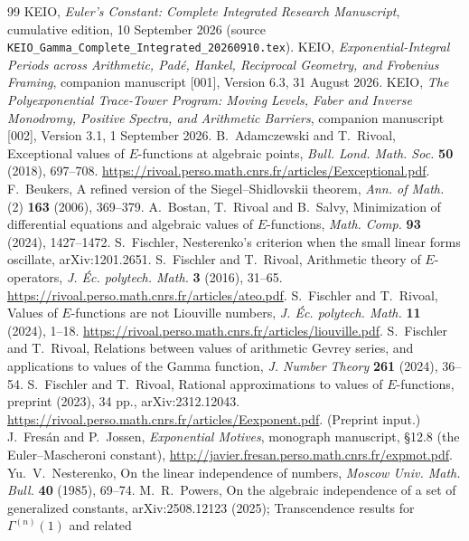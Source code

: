 \documentclass[11pt,a4paper]{article}
\theoremstyle{definition}
\theoremstyle{remark}
\numberwithin{equation}{section}
\begin{document}
\begin{thebibliography}{99}\small
{} KEIO, \emph{Euler's Constant: Complete Integrated Research Manuscript},
cumulative edition, 10 September 2026 (source
\texttt{KEIO\_Gamma\_Complete\_Integrated\_20260910.tex}).
 KEIO, \emph{Exponential-Integral Periods across Arithmetic, Pad\'e, Hankel,
Reciprocal Geometry, and Frobenius Framing}, companion manuscript [001], Version 6.3,
31 August 2026.
 KEIO, \emph{The Polyexponential Trace-Tower Program: Moving Levels, Faber
and Inverse Monodromy, Positive Spectra, and Arithmetic Barriers}, companion manuscript
[002], Version 3.1, 1 September 2026.
 B.~Adamczewski and T.~Rivoal, Exceptional values of $E$-functions at
algebraic points, \emph{Bull. Lond. Math. Soc.} \textbf{50} (2018), 697--708.
\url{https://rivoal.perso.math.cnrs.fr/articles/Eexceptional.pdf}.
 F.~Beukers, A refined version of the Siegel--Shidlovskii theorem,
\emph{Ann. of Math.} (2) \textbf{163} (2006), 369--379.
 A.~Bostan, T.~Rivoal and B.~Salvy, Minimization of differential equations
and algebraic values of $E$-functions, \emph{Math. Comp.} \textbf{93} (2024), 1427--1472.
 S.~Fischler, Nesterenko's criterion when the small linear forms
oscillate, arXiv:1201.2651.
 S.~Fischler and T.~Rivoal, Arithmetic theory of $E$-operators,
\emph{J. \'Ec. polytech. Math.} \textbf{3} (2016), 31--65.
\url{https://rivoal.perso.math.cnrs.fr/articles/ateo.pdf}.
 S.~Fischler and T.~Rivoal, Values of $E$-functions are not
Liouville numbers, \emph{J. \'Ec. polytech. Math.} \textbf{11} (2024), 1--18.
\url{https://rivoal.perso.math.cnrs.fr/articles/liouville.pdf}.
 S.~Fischler and T.~Rivoal, Relations between values of arithmetic
Gevrey series, and applications to values of the Gamma function, \emph{J. Number Theory}
\textbf{261} (2024), 36--54.
 S.~Fischler and T.~Rivoal, Rational approximations to values of
$E$-functions, preprint (2023), 34 pp., arXiv:2312.12043.
\url{https://rivoal.perso.math.cnrs.fr/articles/Eexponent.pdf}. (Preprint input.)
 J.~Fres\'an and P.~Jossen, \emph{Exponential Motives}, monograph manuscript,
\S12.8 (the Euler--Mascheroni constant), \url{http://javier.fresan.perso.math.cnrs.fr/expmot.pdf}.
 Yu.~V.~Nesterenko, On the linear independence of numbers,
\emph{Moscow Univ. Math. Bull.} \textbf{40} (1985), 69--74.
 M.~R.~Powers, On the algebraic independence of a set of generalized
constants, arXiv:2508.12123 (2025); Transcendence results for $\Gamma^{(n)}(1)$ and related

\end{thebibliography}
\end{document}
